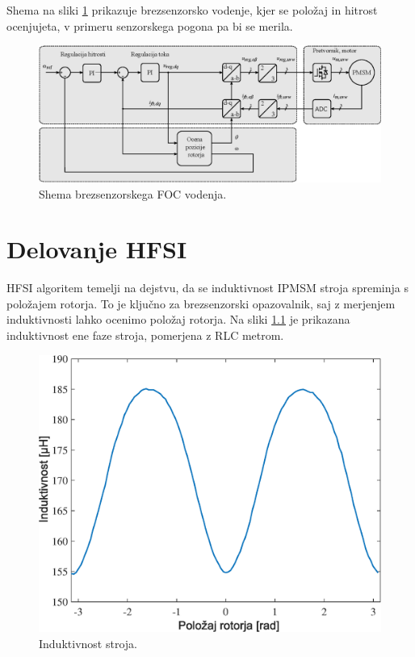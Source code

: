 \documentclass[a4paper,twoside,openright,12pt,slovene]{book}
\begin{document}
Shema na sliki \ref{FOCshema} prikazuje brezsenzorsko vodenje, kjer se položaj in hitrost ocenjujeta, v primeru senzorskega pogona pa bi se merila.

\begin{figure}[!htbp]
    \centering
    \includegraphics[width=1\columnwidth]{Slike/Inkscape/FOCsimple.eps}
    \caption{\label{FOCshema} Shema brezsenzorskega FOC vodenja.}
\end{figure}



\chapter{Delovanje HFSI} \label{teorija}

HFSI algoritem temelji na dejstvu, da se induktivnost IPMSM stroja spreminja s položajem rotorja. To je ključno za brezsenzorski opazovalnik, saj z merjenjem induktivnosti lahko ocenimo položaj
rotorja. Na sliki \ref{induktivnostStroja} je prikazana induktivnost ene faze stroja, pomerjena z RLC metrom.

\begin{figure}[!htbp]
    \centering
    \includegraphics[width=0.72\columnwidth]{Slike/induktivnostStroja.eps}
    \caption{\label{induktivnostStroja} Induktivnost stroja. }
\end{figure}
\end{document}
